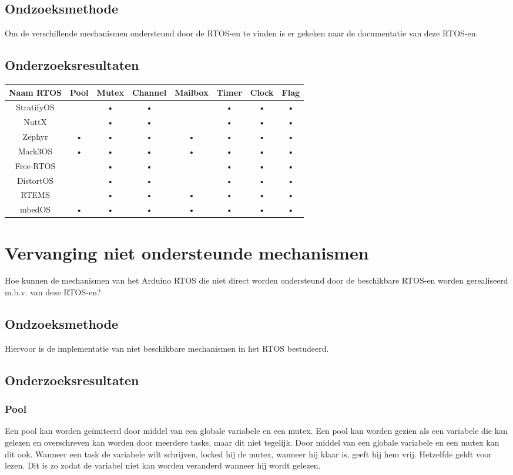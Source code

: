 \documentclass{article}
\begin{document}
\subsection{Ondzoeksmethode}
Om de verschillende mechanismen ondersteund door de RTOS-en te vinden is er gekeken naar de documentatie van deze RTOS-en.
\subsection{Onderzoeksresultaten}
\begin{tabular}{|c|c|c|c|c|c|c|c|}
\hline 
Naam RTOS & Pool & Mutex & Channel & Mailbox & Timer & Clock & Flag \\ 
\hline 
\hline
StratifyOS &  & • & • &  & • & • & • \\ 
\hline
NuttX &  & • & • &  & • & • & • \\ 
\hline 
Zephyr & • & • & • & • & • & • & • \\ 
\hline 
Mark3OS & • & • & • & • & • & • & • \\ 
\hline 
Free-RTOS &  & • & • &  & • & • & • \\ 
\hline 
DistortOS &  & • & • &  & • & • & • \\ 
\hline 
RTEMS\cite{RTEMSDOCS} &  & • & • & • & • & • & • \\ 
\hline 
mbedOS\cite{mbedOSDOCS} & • & • & • & • & • & • &  • \\ 
\hline 
\end{tabular} 

\section{Vervanging niet ondersteunde mechanismen}
Hoe kunnen de mechanismen van het Arduino RTOS die niet direct worden ondersteund door de beschikbare RTOS-en worden gerealiseerd m.b.v. van deze RTOS-en?
\subsection{Ondzoeksmethode}
Hiervoor is de implementatie van niet beschikbare mechanismen in het RTOS bestudeerd.
\subsection{Onderzoeksresultaten}

\subsubsection{Pool}
Een pool kan worden geïmiteerd door middel van een globale variabele en een mutex. Een pool kan worden gezien als een variabele die kan gelezen en overschreven kan worden door meerdere tasks, maar dit niet tegelijk. Door middel van een globale variabele en een mutex kan dit ook. Wanneer een task de variabele wilt schrijven, locked hij de mutex, wanneer hij klaar is, geeft hij hem vrij. Hetzelfde geldt voor lezen. Dit is zo zodat de variabel niet kan worden veranderd wanneer hij wordt gelezen. 
\end{document}
